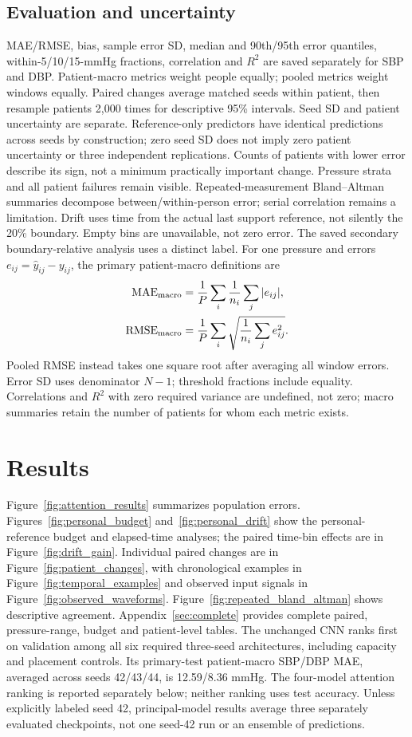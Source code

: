 \documentclass[11pt]{article}
\begin{document}
\subsection{Evaluation and uncertainty}
MAE/RMSE, bias, sample error SD, median and 90th/95th error quantiles,
within-5/10/15-mmHg fractions, correlation and $R^2$ are saved separately
for SBP and DBP. Patient-macro metrics weight people equally; pooled metrics
weight windows equally. Paired changes average matched seeds within patient,
then resample patients 2,000 times for descriptive 95\% intervals. Seed SD and
patient uncertainty are separate. Reference-only predictors have identical
predictions across seeds by construction; zero seed SD does not imply zero
patient uncertainty or three independent replications. Counts of patients
with lower error describe its sign, not a minimum practically important change.
Pressure strata and all patient failures
remain visible. Repeated-measurement Bland--Altman summaries decompose
between/within-person error; serial correlation remains a limitation.
Drift uses time from the actual last support reference, not silently the 20\%
boundary. Empty bins are unavailable, not zero error. The saved secondary
boundary-relative analysis uses a distinct label.
For one pressure and errors $e_{ij}=\hat y_{ij}-y_{ij}$, the primary
patient-macro definitions are
\begin{align}
{\rm MAE}_{\rm macro}&=\frac{1}{P}\sum_i\frac{1}{n_i}\sum_j|e_{ij}|,\\
{\rm RMSE}_{\rm macro}&=\frac{1}{P}\sum_i\sqrt{\frac{1}{n_i}\sum_j e_{ij}^2}.
\end{align}
Pooled RMSE instead takes one square root after averaging all window errors.
Error SD uses denominator $N-1$; threshold fractions include equality.
Correlations and $R^2$ with zero required variance are undefined, not zero;
macro summaries retain the number of patients for whom each metric exists.

\section{Results}
Figure~\ref{fig:attention_results} summarizes population errors.
Figures~\ref{fig:personal_budget} and~\ref{fig:personal_drift} show the
personal-reference budget and elapsed-time analyses; the paired time-bin
effects are in Figure~\ref{fig:drift_gain}. Individual paired changes are in
Figure~\ref{fig:patient_changes}, with chronological examples in
Figure~\ref{fig:temporal_examples} and observed input signals in
Figure~\ref{fig:observed_waveforms}. Figure~\ref{fig:repeated_bland_altman}
shows descriptive agreement. Appendix~\ref{sec:complete} provides complete
paired, pressure-range, budget and patient-level tables.
The unchanged CNN ranks first on validation among all six required three-seed architectures, including capacity and placement controls. Its primary-test patient-macro SBP/DBP MAE, averaged across seeds 42/43/44, is 12.59/8.36 mmHg. The four-model attention ranking is reported separately below; neither ranking uses test accuracy. Unless explicitly labeled seed 42, principal-model results average three separately evaluated checkpoints, not one seed-42 run or an ensemble of predictions.
\end{document}
